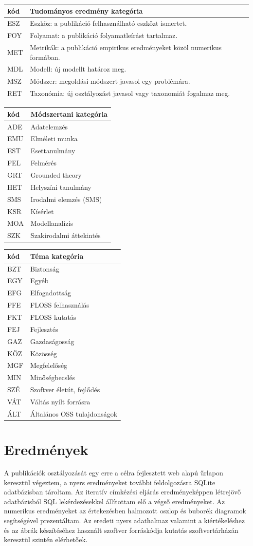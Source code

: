 \documentclass[12pt,magyar,a4paper,oneside]{scrreprt}
\begin{document}
\begin{longtable}[]{@{}ll@{}}
\toprule
kód & Tudományos eredmény kategória\tabularnewline
\midrule
\endhead
ESZ & Eszköz: a publikáció felhasználható eszközt
ismertet.\tabularnewline
FOY & Folyamat: a publikáció folyamatleírást tartalmaz.\tabularnewline
MET & Metrikák: a publikáció empirikus eredményeket közöl numerikus
formában.\tabularnewline
MDL & Modell: új modellt határoz meg.\tabularnewline
MSZ & Módszer: megoldási módszert javasol egy problémára.\tabularnewline
RET & Taxonómia: új osztályozást javasol vagy taxonomiát fogalmaz
meg.\tabularnewline
\bottomrule
\end{longtable}

\begin{longtable}[]{@{}ll@{}}
\toprule
kód & Módszertani kategória\tabularnewline
\midrule
\endhead
ADE & Adatelemzés\tabularnewline
EMU & Elméleti munka\tabularnewline
EST & Esettanulmány\tabularnewline
FEL & Felmérés\tabularnewline
GRT & Grounded theory\tabularnewline
HET & Helyszíni tanulmány\tabularnewline
SMS & Irodalmi elemzés (SMS)\tabularnewline
KSR & Kísérlet\tabularnewline
MOA & Modellanalízis\tabularnewline
SZK & Szakirodalmi áttekintés\tabularnewline
\bottomrule
\end{longtable}

\begin{longtable}[]{@{}ll@{}}
\toprule
kód & Téma kategória\tabularnewline
\midrule
\endhead
BZT & Biztonság\tabularnewline
EGY & Egyéb\tabularnewline
EFG & Elfogadottság\tabularnewline
FFE & FLOSS felhasználás\tabularnewline
FKT & FLOSS kutatás\tabularnewline
FEJ & Fejlesztés\tabularnewline
GAZ & Gazdaságosság\tabularnewline
KÖZ & Közösség\tabularnewline
MGF & Megfelelőség\tabularnewline
MIN & Minőségbecslés\tabularnewline
SZÉ & Szoftver életút, fejlődés\tabularnewline
VÁT & Váltás nyílt forrásra\tabularnewline
ÁLT & Általános OSS tulajdonságok\tabularnewline
\bottomrule
\end{longtable}

\hypertarget{eredmuxe9nyek}{%
\section{Eredmények}\label{eredmuxe9nyek}}

A publikációk osztályozását egy erre a célra fejlesztett web alapú
űrlapon keresztül végeztem, a nyers eredményeket további feldolgozásra
SQLite adatbázisban tároltam. Az iteratív címkézési eljárás
eredményeképpen létrejövő adatbázisból SQL lekérdezésekkel állítottam
elő a végső eredményeket. Az numerikus eredményeket az értekezésben
halmozott oszlop és buborék diagramok segítségével prezentáltam. Az
eredeti nyers adathalmaz valamint a kiértékeléshez és az ábrák
készítéséhez használt szoftver forráskódja kutatás szoftvertárházán
keresztül szintén elérhetőek.
\end{document}
